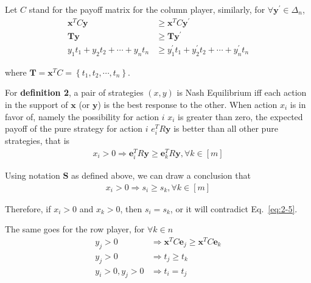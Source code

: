 \documentclass[oneside,solution]{seu-ml-assign}
\begin{document}
Let \(C\) stand for the payoff matrix for the column player, similarly,
for \(\forall \mathbf{y^{'}} \in \Delta_n\),
\begin{equation}
\begin{aligned}
\mathbf{x}^TC\mathbf{y} &\geq \mathbf{x}^{T}C\mathbf{y^{'}} \\
\mathbf{T}\mathbf{y} &\geq \mathbf{T}\mathbf{y^{'}}\\
y_1t_1+y_2t_2+\cdots+y_nt_n&
\geq y_1^{'}t_1+y_2^{'}t_2+\cdots+y_n^{'}t_n
\end{aligned}
\label{eq:2-3}
\end{equation}

where
\(\mathbf{T}=\mathbf{x}^{T}C = \left\{t_1,t_2,\cdots,t_n\right\}\).

For \textbf{definition 2}, a pair of strategies \((x,y)\) is Nash
Equilibrium iff each action in the support of \(\mathbf{x}\) (or
\(\mathbf{y}\)) is the best response to the other. When action \(x_i\)
is in favor of, namely the possibility for action \(i\) \(x_i\) is
greater than zero, the expected payoff of the pure strategy for action
\(i\) \(e_i^{T}R\mathbf{y}\) is better than all other pure strategies,
that is
\begin{equation}
    \begin{aligned}
        x_i>0 \Rightarrow \mathbf{e}_i^{T}R\mathbf{y}\geq \mathbf{e}_k^{T}R\mathbf{y}, \forall k \in [m]
    \end{aligned}
\end{equation}

Using notation \(\mathbf{S}\) as defined above, we can draw a conclusion
that
\begin{equation}
    \begin{aligned}
        x_i > 0 \Rightarrow s_i\geq s_k, \forall k \in [m]
    \end{aligned}
    \label{eq:2-5}
\end{equation}

Therefore, if \(x_i >0\) and \(x_k>0\), then \(s_i = s_k\), or it will
contradict Eq.~\eqref{eq:2-5}.

The same goes for the row player, for \(\forall k \in n\)
\begin{align}
y_j>0 &\Rightarrow \mathbf{x}^{T}C\mathbf{e}_{j}\geq \mathbf{x}^{T}C\mathbf{e}_k \label{eq:2-6}\\
y_j >0 &\Rightarrow t_j\geq t_k \label{eq:2-7}\\
y_i > 0,y_j>0 &\Rightarrow t_i=t_j \label{eq:2-8}
\end{align}
\end{document}
